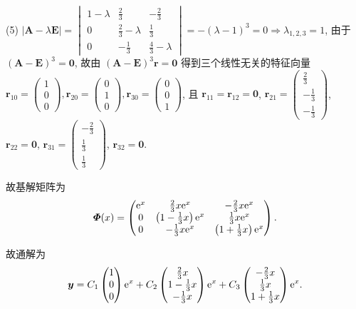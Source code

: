 \begin{solution}
  (5) $|\bm{A}-\lambda\bm{E}|=\begin{vmatrix}1-\lambda&\frac{2}{3}&-\frac{2}{3}\\0&\frac{2}{3}-\lambda&\frac{1}{3}\\0&-\frac{1}{3}&\frac{4}{3}-\lambda\end{vmatrix}=-(\lambda-1)^3=0\Rightarrow\lambda_{1,2,3}=1$, 
  由于 $(\bm{A}-\bm{E})^3=\bm{0}$, 
  故由 $(\bm{A}-\bm{E})^3\bm{r}=\bm{0}$ 得到三个线性无关的特征向量
  $\bm{r}_{10}=\begin{pmatrix}1\\0\\0\end{pmatrix},\bm{r}_{20}=\begin{pmatrix}0\\1\\0\end{pmatrix},\bm{r}_{30}=\begin{pmatrix}0\\0\\1\end{pmatrix}$, 
  且 $\bm{r}_{11}=\bm{r}_{12}=\bm{0}$, $\bm{r}_{21}=\begin{pmatrix}\frac{2}{3}\\-\frac{1}{3}\\-\frac{1}{3}\end{pmatrix}$,
  $\bm{r}_{22}=\bm{0}$, $\bm{r}_{31}=\begin{pmatrix}-\frac{2}{3}\\\frac{1}{3}\\\frac{1}{3}\end{pmatrix}$,
  $\bm{r}_{32}=\bm{0}$.

  故基解矩阵为
  \[\bm{\varPhi}(x)=
  \begin{pmatrix}
    \mathrm{e}^x &\frac{2}{3}x\mathrm{e}^x                & -\frac{2}{3}x\mathrm{e}^x \\
    0    &\left(1-\frac{1}{3}x\right)\mathrm{e}^x & \frac{1}{3}x\mathrm{e}^x \\
    0    &-\frac{1}{3}x\mathrm{e}^x               & \left(1+\frac{1}{3}x\right)\mathrm{e}^x
  \end{pmatrix}.\]

  故通解为
  \[\bm{y} = C_1\begin{pmatrix}1\\0\\0\end{pmatrix}\mathrm{e}^x
    + C_2\begin{pmatrix}\frac{2}{3}x\\1-\frac{1}{3}x\\-\frac{1}{3}x\end{pmatrix}\mathrm{e}^x
    + C_3\begin{pmatrix}-\frac{2}{3}x\\\frac{1}{3}x\\1+\frac{1}{3}x\end{pmatrix}\mathrm{e}^x.\]


\end{solution}
